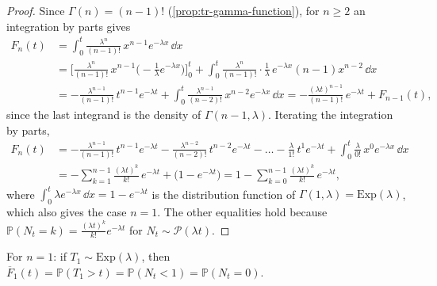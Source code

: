 \begin{proof}
Since $\Gamma(n)=(n-1)!$ (\cref{prop:tr-gamma-function}), for $n\ge2$ an integration by parts
gives
\[
\begin{aligned}
  F_n(t)&=\int_0^t\frac{\lambda^n}{(n-1)!}\,x^{n-1}e^{-\lambda x}\,\dd x\\
  &=\Big[\frac{\lambda^n}{(n-1)!}\,x^{n-1}\Big(-\frac1\lambda e^{-\lambda x}\Big)\Big]_0^t
   +\int_0^t\frac{\lambda^n}{(n-1)!}\cdot\frac1\lambda\,e^{-\lambda x}(n-1)x^{n-2}\,\dd x\\
  &=-\frac{\lambda^{n-1}}{(n-1)!}\,t^{n-1}e^{-\lambda t}
   +\int_0^t\frac{\lambda^{n-1}}{(n-2)!}\,x^{n-2}e^{-\lambda x}\,\dd x
  =-\frac{(\lambda t)^{n-1}}{(n-1)!}\,e^{-\lambda t}+F_{n-1}(t),
\end{aligned}
\]
since the last integrand is the density of $\Gamma(n-1,\lambda)$. Iterating the integration by
parts,
\[
\begin{aligned}
  F_n(t)&=-\frac{\lambda^{n-1}}{(n-1)!}\,t^{n-1}e^{-\lambda t}-\frac{\lambda^{n-2}}{(n-2)!}\,t^{n-2}e^{-\lambda t}
   -\dots-\frac{\lambda}{1!}\,t^1e^{-\lambda t}+\int_0^t\frac{\lambda}{0!}\,x^0e^{-\lambda x}\,\dd x\\
  &=-\sum_{k=1}^{n-1}\frac{(\lambda t)^k}{k!}\,e^{-\lambda t}+\big(1-e^{-\lambda t}\big)
   =1-\sum_{k=0}^{n-1}\frac{(\lambda t)^k}{k!}\,e^{-\lambda t},
\end{aligned}
\]
where $\int_0^t\lambda e^{-\lambda x}\,\dd x=1-e^{-\lambda t}$ is the distribution function of
$\Gamma(1,\lambda)=\mathrm{Exp}(\lambda)$, which also gives the case $n=1$. The other equalities
hold because $\mathbb P(N_t=k)=\frac{(\lambda t)^k}{k!}e^{-\lambda t}$ for $N_t\sim\mathcal P(\lambda t)$.
\end{proof}

For $n=1$: if $T_1\sim\mathrm{Exp}(\lambda)$, then $\overline F_1(t)=\mathbb P(T_1>t)=\mathbb P(N_t<1)=\mathbb P(N_t=0)$.

